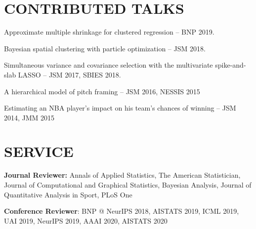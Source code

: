 \documentclass[margin]{res}
\begin{document}
\begin{resume}


\section{CONTRIBUTED \hspace{0.1in} TALKS}

Approximate multiple shrinkage for clustered regression -- BNP 2019.

Bayesian spatial clustering with particle optimization -- JSM 2018. 

Simultaneous variance and covariance selection with the multivariate spike-and-slab LASSO -- JSM 2017, SBIES 2018.

A hierarchical model of pitch framing -- JSM 2016, NESSIS 2015


Estimating an NBA player's impact on his team's chances of winning -- JSM 2014, JMM 2015





\section{SERVICE}
\textbf{Journal Reviewer:} Annals of Applied Statistics, The American Statistician, Journal of Computational and Graphical Statistics, Bayesian Analysis, Journal of Quantitative Analysis in Sport, PLoS One

\textbf{Conference Reviewer}: BNP @ NeurIPS 2018, AISTATS 2019, ICML 2019, UAI 2019, NeurIPS 2019, AAAI 2020, AISTATS 2020



\end{resume} 
\end{document}
